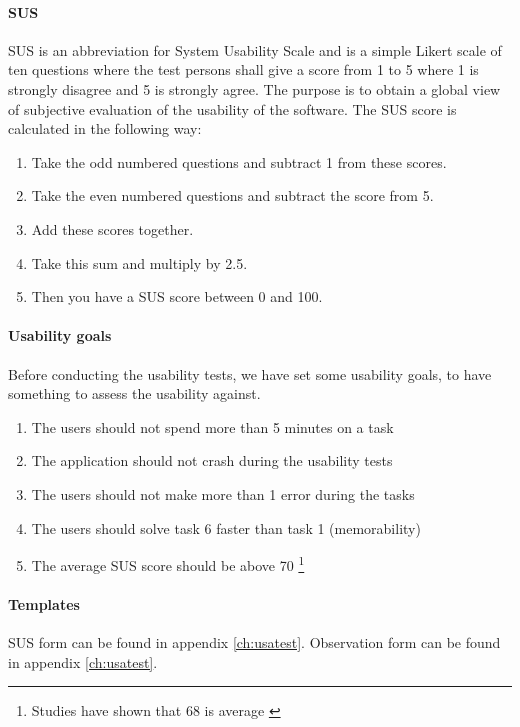 \paragraph{SUS}\hfill
\newline
SUS is an abbreviation for System Usability Scale \cite{bib:sus} and is a simple Likert scale of ten questions where the test persons shall give a score from 1 to 5 where 1 is strongly disagree and 5 is strongly agree. The purpose is to obtain a global view of subjective evaluation of the usability of the software.
\newline
The SUS score is calculated in the following way:
\begin{enumerate}
\item{}Take the odd numbered questions and subtract 1 from these scores.
\item{}Take the even numbered questions and subtract the score from 5.
\item{}Add these scores together. 
\item{}Take this sum and multiply by 2.5.
\item{}Then you have a SUS score between 0 and 100.
\end{enumerate}

\paragraph{Usability goals}\hfill
\newline
Before conducting the usability tests, we have set some usability goals, to have something to assess the usability against.
\begin{enumerate}
\item{}The users should not spend more than 5 minutes on a task
\item{}The application should not crash during the usability tests
\item{}The users should not make more than 1 error during the tasks
\item{}The users should solve task 6 faster than task 1 (memorability)
\item{}The average SUS score should be above 70 \footnote{Studies have shown that 68 is average \cite{bib:susavg}}
\end{enumerate}

\paragraph{Templates}\hfill
\newline
SUS form can be found in appendix \ref{ch:usatest}.
\newline\newline
Observation form can be found in appendix \ref{ch:usatest}.

